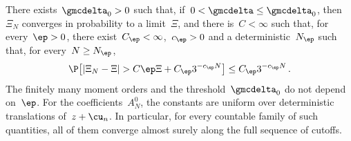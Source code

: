 \documentclass[11pt]{amsart}
\begin{document}
\begin{proposition}
\label{mfd:prop-as-response-bank}
There exists~$\gmcdelta_0>0$ such that, if~$0<\gmcdelta\leq\gmcdelta_0$, then~$\Xi_N$ converges in probability to a limit~$\Xi$, and there is~$C<\infty$ such that, for every~$\ep>0$, there exist~$C_\ep<\infty$,~$c_\ep>0$ and a deterministic~$N_\ep$ such that, for every~$N\geq N_\ep$,
\begin{equation}
	\P\bigl[|\Xi_N-\Xi|>
	C\ep \Xi+C_\ep3^{-c_\ep N}\bigr]
	\leq C_\ep3^{-c_\ep N}\,.
	\label{eq:mfd-summable-response}
\end{equation}
The finitely many moment orders and the threshold~$\gmcdelta_0$ do not depend on~$\ep$. For the coefficients~$A_N^0$, the constants are uniform over deterministic translations of~$z+\cu_n$. In particular, for every countable family of such quantities, all of them converge almost surely along the full sequence of cutoffs.
\end{proposition}
\end{document}
